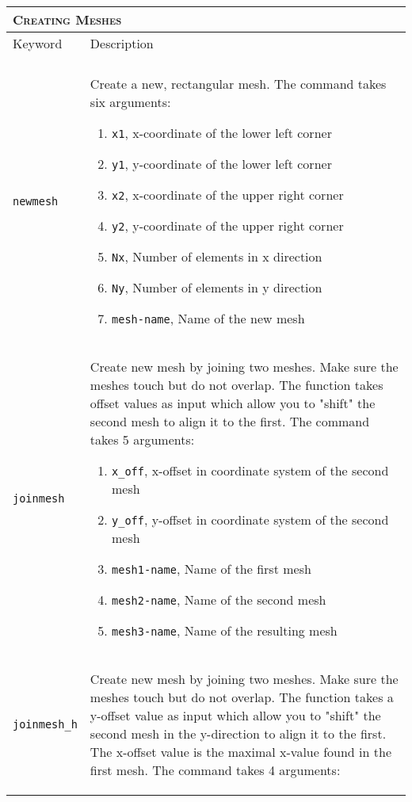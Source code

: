 \documentclass[noshowpacs,preprintnumbers,amsmath,amssymb, letter]{revtex4}
\begin{document}
\begin{longtable}{p{}p{}}
\multicolumn{2}{l}{\textsc{Creating Meshes}} \\*
\hline
Keyword & Description \\
\hline\\
\texttt{newmesh} 	& Create a new, rectangular mesh. The command takes six arguments:
\begin{enumerate}
\item \texttt{x1}, x-coordinate of the lower left corner
\item \texttt{y1}, y-coordinate of the lower left corner
\item \texttt{x2}, x-coordinate of the upper right corner
\item \texttt{y2}, y-coordinate of the upper right corner
\item \texttt{Nx}, Number of elements in x direction
\item \texttt{Ny}, Number of elements in y direction
\item \texttt{mesh-name}, Name of the new mesh
\end{enumerate}\\
\texttt{joinmesh}	& Create new mesh by joining two meshes. Make sure the meshes touch but do not overlap. The function takes offset values as input which allow you to "shift" the second mesh to align it to the first. The command takes 5 arguments:
\begin{enumerate}
\item \texttt{x\_off}, x-offset in coordinate system of the second mesh
\item \texttt{y\_off}, y-offset in coordinate system of the second mesh 
\item \texttt{mesh1-name}, Name of the first mesh
\item \texttt{mesh2-name}, Name of the second mesh
\item \texttt{mesh3-name}, Name of the resulting mesh
\end{enumerate}\\
\texttt{joinmesh\_h}	& Create new mesh by joining two meshes. Make sure the meshes touch but do not overlap. The function takes a y-offset value as input which allow you to "shift" the second mesh in the y-direction to align it to the first. The x-offset value is the maximal x-value found in the first mesh. The command takes 4 arguments:
\begin{enumerate}

\end{enumerate}
\end{longtable}
\end{document}
